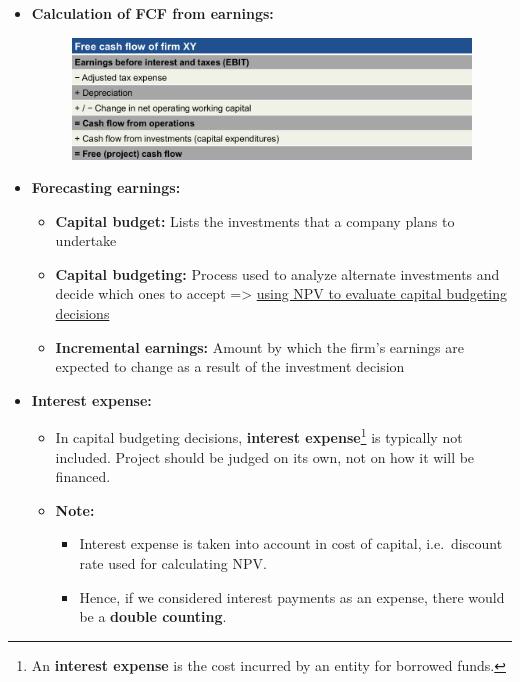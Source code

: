 \documentclass[ieeetran]{article}
\begin{document}
\begin{itemize}
\item \textbf{Calculation of FCF from earnings:}
	\begin{figure}[h!]
	  \centering
	  \includegraphics[width=1.0\linewidth]{FCFearnings.jpg}
	  \label{fig:fCFearnings_jpg}
	\end{figure}

\item \textbf{Forecasting earnings:}
	\begin{itemize}
	  \item \textbf{Capital budget:} Lists the investments that a company plans to undertake
	  \item \textbf{Capital budgeting:} Process used to analyze alternate investments and decide which ones to accept => \underline{using NPV to evaluate capital budgeting decisions}
	  \item \textbf{Incremental earnings:}  Amount by which the firm's earnings are expected to change as a result of the investment decision
 
	\end{itemize}
\item \textbf{Interest expense:}
	\begin{itemize}
		\item In capital budgeting decisions, \textbf{interest expense}\footnote{An \textbf{interest expense} is the cost incurred by an entity for borrowed funds.} is typically not included. Project should be judged on its own, not on how it will be financed.
			\item \textbf{Note:}
				\begin{itemize}
				  \item Interest expense is taken into account in cost of capital, i.e.\ discount rate used for calculating NPV.
				\item Hence, if we considered interest payments as an expense, there would be a \textbf{double counting}.
				\end{itemize}
	\end{itemize}
\end{itemize}











\end{document}
